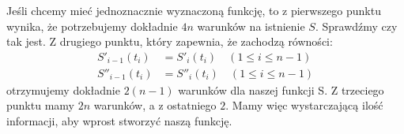 \documentclass[a4paper]{article}
\begin{document}
    Jeśli chcemy mieć jednoznacznie wyznaczoną funkcję, to z pierwszego punktu wynika, że potrzebujemy dokładnie $4n$ warunków
    na istnienie $S$. Sprawdźmy czy tak jest. Z drugiego punktu, który zapewnia, że zachodzą równości:
    \begin{equation}     
        \label{1}   
        \begin{aligned}  
            S'_{i-1}(t_i) &= S'_i(t_i) \quad (1 \leq i \leq n-1) \\
            S''_{i-1}(t_i) &= S''_i(t_i) \quad (1 \leq i \leq n-1)
        \end{aligned}
    \end{equation}
    otrzymujemy dokładnie $2(n-1)$ warunków dla naszej funkcji S. Z trzeciego punktu mamy $2n$ warunków,
    a z ostatniego $2$. Mamy więc wystarczającą ilość informacji, aby wprost stworzyć naszą funkcję.
    
\end{document}
